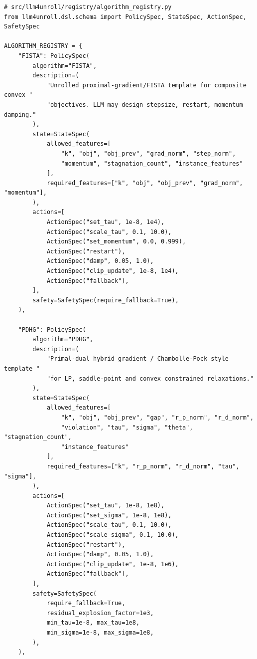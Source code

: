 \documentclass[12pt,a4paper]{ctexart}
\begin{document}
\begin{lstlisting}[style=pythonstyle]
# src/llm4unroll/registry/algorithm_registry.py
from llm4unroll.dsl.schema import PolicySpec, StateSpec, ActionSpec, SafetySpec

ALGORITHM_REGISTRY = {
    "FISTA": PolicySpec(
        algorithm="FISTA",
        description=(
            "Unrolled proximal-gradient/FISTA template for composite convex "
            "objectives. LLM may design stepsize, restart, momentum damping."
        ),
        state=StateSpec(
            allowed_features=[
                "k", "obj", "obj_prev", "grad_norm", "step_norm",
                "momentum", "stagnation_count", "instance_features"
            ],
            required_features=["k", "obj", "obj_prev", "grad_norm", "momentum"],
        ),
        actions=[
            ActionSpec("set_tau", 1e-8, 1e4),
            ActionSpec("scale_tau", 0.1, 10.0),
            ActionSpec("set_momentum", 0.0, 0.999),
            ActionSpec("restart"),
            ActionSpec("damp", 0.05, 1.0),
            ActionSpec("clip_update", 1e-8, 1e4),
            ActionSpec("fallback"),
        ],
        safety=SafetySpec(require_fallback=True),
    ),

    "PDHG": PolicySpec(
        algorithm="PDHG",
        description=(
            "Primal-dual hybrid gradient / Chambolle-Pock style template "
            "for LP, saddle-point and convex constrained relaxations."
        ),
        state=StateSpec(
            allowed_features=[
                "k", "obj", "obj_prev", "gap", "r_p_norm", "r_d_norm",
                "violation", "tau", "sigma", "theta", "stagnation_count",
                "instance_features"
            ],
            required_features=["k", "r_p_norm", "r_d_norm", "tau", "sigma"],
        ),
        actions=[
            ActionSpec("set_tau", 1e-8, 1e8),
            ActionSpec("set_sigma", 1e-8, 1e8),
            ActionSpec("scale_tau", 0.1, 10.0),
            ActionSpec("scale_sigma", 0.1, 10.0),
            ActionSpec("restart"),
            ActionSpec("damp", 0.05, 1.0),
            ActionSpec("clip_update", 1e-8, 1e6),
            ActionSpec("fallback"),
        ],
        safety=SafetySpec(
            require_fallback=True,
            residual_explosion_factor=1e3,
            min_tau=1e-8, max_tau=1e8,
            min_sigma=1e-8, max_sigma=1e8,
        ),
    ),


\end{lstlisting}
\end{document}
